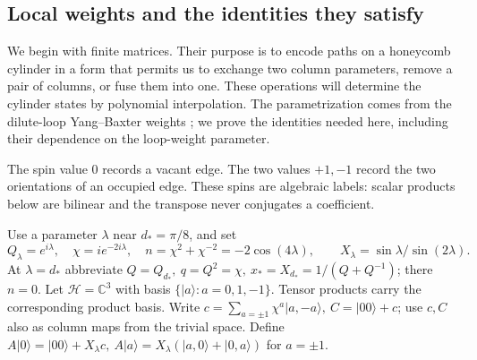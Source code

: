 \subsection{Local weights and the identities they satisfy}\label{c4:local-tensors}

We begin with finite matrices. Their purpose is to encode paths on a
honeycomb cylinder in a form that permits us to exchange two column
parameters, remove a pair of columns, or fuse them into one. These operations
will determine the cylinder states by polynomial interpolation. The
parametrization comes from the dilute-loop Yang--Baxter weights
\cite{ZhouBatchelor1997,GlazmanManolescu2017}; we prove the identities needed
here, including their dependence on the loop-weight parameter.

The spin value $0$ records a vacant edge. The two values $+1,-1$ record the
two orientations of an occupied edge. These spins are algebraic labels:
scalar products below are bilinear and the transpose never conjugates a
coefficient.

Use a parameter \(\lambda\) near \(d_*=\pi/8\), and set
\[
 Q_\lambda=e^{i\lambda},\quad \chi=i e^{-2i\lambda},\quad n=\chi^2+\chi^{-2}=-2\cos(4\lambda),
 \qquad X_\lambda=\sin\lambda/\sin(2\lambda).
\]
At \(\lambda=d_*\) abbreviate \(Q=Q_{d_*},\ q=Q^2=\chi,\ x_*=X_{d_*}=1/(Q+Q^{-1})\); there \(n=0\).
Let $\mathcal H=\mathbb C^3$ with basis
\(\{|a\rangle:a=0,1,-1\}\). Tensor products carry the corresponding
product basis. Write \(c=\sum_{a=\pm1}\chi^a|a,-a\rangle,\ C=|00\rangle+c\); use \(c,C\) also as column maps from the trivial space. Define \(A|0\rangle=|00\rangle+X_\lambda c,\ A|a\rangle=X_\lambda(|a,0\rangle+|0,a\rangle)\) for \(a=\pm1\).

